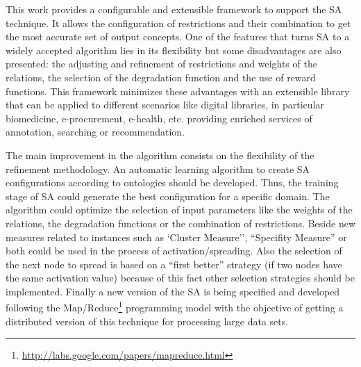 This work provides a configurable and extensible framework to support the SA technique. It allows
the configuration of restrictions and their combination to get
the most accurate set of output concepts. One of the features that
turns SA to a widely accepted algorithm lies in its flexibility 
but some disadvantages are also presented: the adjusting and refinement of
restrictions and weights of the relations, the selection of the
degradation function and the use of reward functions. This framework
minimizes these advantages with an extensible library that can be
applied to different scenarios like digital libraries, in particular
biomedicine, e-procurement, e-health, etc. providing enriched services
of annotation, searching or recommendation.

The main improvement in the algorithm consists on the flexibility of
the refinement methodology. An automatic learning algorithm to create SA configurations
according to ontologies should be developed. Thus, the training stage of SA could generate
the best configuration for a specific domain. The algorithm could optimize the selection 
of input parameters like the weights of the relations, the degradation functions 
or the combination of restrictions. Beside new measures related to instances such as `Cluster
Measure'', ``Specifity Measure'' or both could be used in the process of activation/spreading.
Also the selection of the next node to spread is based on a ``first
better'' strategy (if two nodes have the same activation value) because of this fact
other selection strategies should be implemented. Finally a new version of the SA
is being specified and developed following the Map/Reduce\footnote{\url{http://labs.google.com/papers/mapreduce.html}} programming model with the objective
of getting a distributed version of this technique for processing large data sets.

